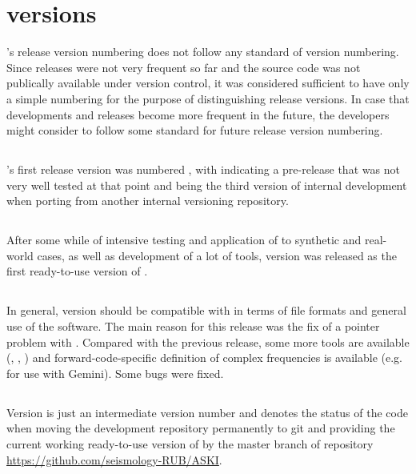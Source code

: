 \section*{\ASKI{} versions}
%
\ASKI{}'s release version numbering does not follow any standard of version numbering. 
Since releases were not very frequent so far and the source code was not publically available under version control, 
it was considered sufficient to have only a simple numbering for the purpose of distinguishing release versions.
In case that developments and releases become more frequent in the future, the \ASKI{} developers might consider
to follow some standard for future release version numbering.

\subsection*{\ASKI{} }
\ASKI{}'s first release version was numbered , with  indicating a pre-release
that was not very well tested at that point and  being the third version of internal
development when porting from another internal versioning repository.

\subsection*{\ASKI{} }
After some while of intensive testing and application of \ASKI{} to synthetic and real-world cases, 
as well as development of a lot of \ASKI{} tools, version  was released as the first
ready-to-use version of \ASKI{}.

\subsection*{\ASKI{} }
In general, version  should be compatible with  in terms of file formats and general use
of the software. The main reason for this release was the fix of a pointer problem with .
Compared with the previous release, some more tools are available (, 
, ) and forward-code-specific 
definition of complex frequencies is available (e.g. for use with Gemini). Some bugs were fixed.

\subsection*{\ASKI{} }
Version  is just an intermediate version number and denotes the status of the code when moving the 
development repository permanently to git and providing the current working ready-to-use version of \ASKI{} by the 
master branch of repository \url{https://github.com/seismology-RUB/ASKI}.


